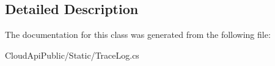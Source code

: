 \subsection{Detailed Description}


The documentation for this class was generated from the following file\-:\begin{DoxyCompactItemize}
\item 
Cloud\-Api\-Public/\-Static/Trace\-Log.\-cs\end{DoxyCompactItemize}
